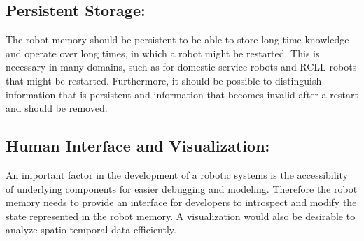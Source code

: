 \subsection{Persistent Storage:} The robot memory should be persistent
to be able to store long-time knowledge and operate over long times,
in which a robot might be restarted. This is necessary in many
domains, such as for domestic service robots and RCLL robots that
might be restarted. Furthermore, it should be possible to distinguish
information that is persistent and information that becomes invalid
after a restart and should be removed.

\subsection{Human Interface and Visualization:} An important factor in the
development of a robotic systems is the accessibility of underlying
components for easier debugging and modeling. Therefore the robot
memory needs to provide an interface for developers to introspect and
modify the state represented in the robot memory. A visualization
would also be desirable to analyze spatio-temporal data efficiently.


